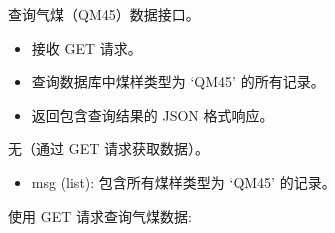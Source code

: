 \documentclass[a4paper,12pt,english]{sphinxmanual}
\begin{document}
\begin{fulllineitems}
\label{\detokenize{api/login:login.getQiCoalData}}
\pysigstartsignatures
{}
\pysigstopsignatures
\sphinxAtStartPar
查询气煤（QM45）数据接口。
\begin{description}
\begin{itemize}
\item {} 
\sphinxAtStartPar
接收 GET 请求。

\item {} 
\sphinxAtStartPar
查询数据库中煤样类型为 ‘QM45’ 的所有记录。

\item {} 
\sphinxAtStartPar
返回包含查询结果的 JSON 格式响应。

\end{itemize}

\sphinxAtStartPar
无（通过 GET 请求获取数据）。

\begin{description}
\begin{itemize}
\item {} 
\sphinxAtStartPar
msg (list): 包含所有煤样类型为 ‘QM45’ 的记录。

\end{itemize}

\end{description}

\sphinxAtStartPar
使用 GET 请求查询气煤数据:

\begin{sphinxVerbatim}[commandchars=\\\{\}]
 


\end{sphinxVerbatim}
\end{description}
\end{fulllineitems}
\end{document}
